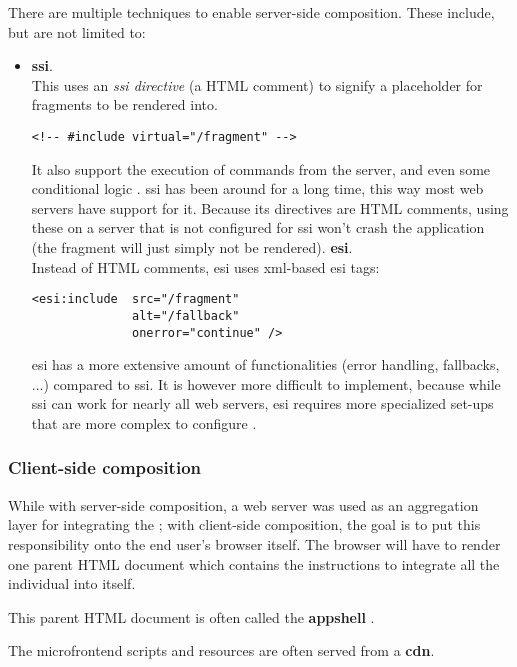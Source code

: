 There are multiple techniques to enable server-side composition. These include,
but are not limited to:
\begin{itemize}
  \item \textbf{\gls{ssi}}.\\
  This uses an \textit{\gls{ssi} directive} (a HTML comment) to signify a
  placeholder for fragments to be rendered into.
  \begin{verbatim}
<!-- #include virtual="/fragment" -->
  \end{verbatim}
  It also support the execution of commands from the server, and even some
  conditional logic \autocite{Apache_2013}. \gls{ssi} has been around for a long
  time, this way most web servers have support for it. Because its directives
  are HTML comments, using these on a server that is not configured for
  \gls{ssi} won't crash the application (the fragment will just simply not be
  rendered).
  \spacedItem  \textbf{\gls{esi}}.\\
  Instead of HTML comments, \gls{esi} uses \gls{xml}-based \gls{esi} tags:
  \begin{verbatim}
<esi:include  src="/fragment" 
              alt="/fallback" 
              onerror="continue" />
  \end{verbatim}
  \gls{esi} has a more extensive amount of functionalities (error handling,
  fallbacks, ...) compared to \gls{ssi}. It is however more difficult to
  implement, because while \gls{ssi} can work for nearly all web servers,
  \gls{esi} requires more specialized set-ups that are more complex to configure
  \autocite{Rappl_2021}.
\end{itemize}


\subsubsection{Client-side composition}

While with server-side composition, a web server was used as an aggregation
layer for integrating the ; with client-side
composition, the goal is to put this responsibility onto the end user's browser
itself. The browser will have to render one parent HTML document which contains
the instructions to integrate all the individual  into
itself.

This parent HTML document is often called the \textbf{\gls{appshell}}
\autocite{Geers_2020}\autocite{Rappl_2021}. 

The \gls{microfrontend} scripts and resources are often served from a
\textbf{\gls{cdn}}.

